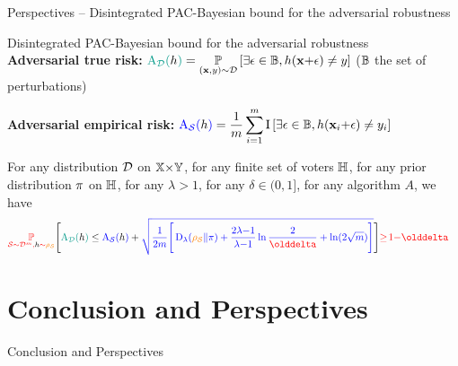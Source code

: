 \documentclass{slides}
\begin{document}
\begin{xframe}{Perspectives -- {\small Disintegrated PAC-Bayesian bound for the adversarial robustness}}

\vspace{-0.3cm}

\begin{xblock}{}
 Disintegrated PAC-Bayesian bound for the adversarial robustness\\[0.5cm]

{\bf Adversarial true risk:} $\displaystyle\green{\RiskA_{\D}(\h)} = \PP_{(\x,\y)\sim\D}\LB\exists\epsilon\in\Xpert, \h(\x{+}\epsilon)\ne \y\RB$ {\scriptsize ($\Xpert$ the set of perturbations)}

{\bf Adversarial empirical risk:} $\displaystyle\blue{\RiskA_{\dS}(\h)} = \frac{1}{\m}\sum_{i=1}^{\m}\indic\LB\exists\epsilon\in\Xpert, \h(\x_i{+}\epsilon)\ne \y_i\RB$


\end{xblock}

\vspace{0.1cm}

\begin{redbox}{}

{\scriptsize For any distribution $\D$ on $\X{\times}\Y$, for any finite set of voters $\H$, for any prior distribution $\P$ on $\H$, for any $\lambda>1$, for any $\delta \in (0, 1]$, for any algorithm $A$, we have}\\[-0.6cm]
\begin{align*}
    &\red{\PP_{\dS\sim\D^{\m},\h\sim \AQ}}\Bigg[ 
    \green{\RiskA_{\D}(\h)} \le \blue{\RiskA_{\dS}(\h)} + \blue{\sqrt{\frac{1}{2\m}\Bigg[ \Renyi_{\lambda}(\AQ\|\P) + {\frac{2\lambda{-}1}{\lambda{-}1}}\ln\frac{2}{\delta} + \ln(2\sqrt{m})\Bigg]}} \Bigg] \red{\ge\! 1{-}\delta}
\end{align*}
\end{redbox}

\vfill

\end{xframe}


\section{Conclusion and Perspectives}
\begin{xtitle}
{\huge Conclusion and Perspectives}
\end{xtitle}
\end{document}
